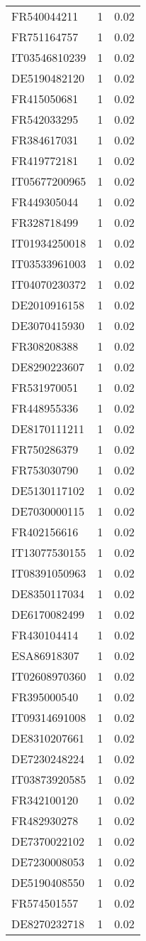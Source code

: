 \begin{table*}[htbp]
\begin{tabular}{lrr}
FR540044211 & 1 & 0.02 \\
FR751164757 & 1 & 0.02 \\
IT03546810239 & 1 & 0.02 \\
DE5190482120 & 1 & 0.02 \\
FR415050681 & 1 & 0.02 \\
FR542033295 & 1 & 0.02 \\
FR384617031 & 1 & 0.02 \\
FR419772181 & 1 & 0.02 \\
IT05677200965 & 1 & 0.02 \\
FR449305044 & 1 & 0.02 \\
FR328718499 & 1 & 0.02 \\
IT01934250018 & 1 & 0.02 \\
IT03533961003 & 1 & 0.02 \\
IT04070230372 & 1 & 0.02 \\
DE2010916158 & 1 & 0.02 \\
DE3070415930 & 1 & 0.02 \\
FR308208388 & 1 & 0.02 \\
DE8290223607 & 1 & 0.02 \\
FR531970051 & 1 & 0.02 \\
FR448955336 & 1 & 0.02 \\
DE8170111211 & 1 & 0.02 \\
FR750286379 & 1 & 0.02 \\
FR753030790 & 1 & 0.02 \\
DE5130117102 & 1 & 0.02 \\
DE7030000115 & 1 & 0.02 \\
FR402156616 & 1 & 0.02 \\
IT13077530155 & 1 & 0.02 \\
IT08391050963 & 1 & 0.02 \\
DE8350117034 & 1 & 0.02 \\
DE6170082499 & 1 & 0.02 \\
FR430104414 & 1 & 0.02 \\
ESA86918307 & 1 & 0.02 \\
IT02608970360 & 1 & 0.02 \\
FR395000540 & 1 & 0.02 \\
IT09314691008 & 1 & 0.02 \\
DE8310207661 & 1 & 0.02 \\
DE7230248224 & 1 & 0.02 \\
IT03873920585 & 1 & 0.02 \\
FR342100120 & 1 & 0.02 \\
FR482930278 & 1 & 0.02 \\
DE7370022102 & 1 & 0.02 \\
DE7230008053 & 1 & 0.02 \\
DE5190408550 & 1 & 0.02 \\
FR574501557 & 1 & 0.02 \\
DE8270232718 & 1 & 0.02 \\
\bottomrule
\end{tabular}
\end{table*}
